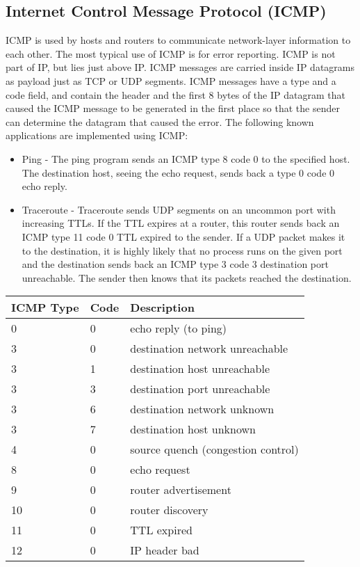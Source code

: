 \subsection{Internet Control Message Protocol (ICMP)}
ICMP is used by hosts and routers to communicate network-layer information to each other. The most typical use of ICMP is for error reporting. ICMP is not part of IP, but lies just above IP. ICMP messages are carried inside IP datagrams as payload just as TCP or UDP segments. ICMP messages have a type and a code field, and contain the header and the first 8 bytes of the IP datagram that caused the ICMP message to be generated in the first place so that the sender can determine the datagram that caused the error. The following known applications are implemented using ICMP:
\begin{itemize}
\item Ping - The ping program sends an ICMP type 8 code 0 to the specified host. The destination host, seeing the echo request, sends back a type 0 code 0 echo reply.
\item Traceroute - Traceroute sends UDP segments on an uncommon port with increasing TTLs. If the TTL expires at a router, this router sends back an ICMP type 11 code 0 TTL expired to the sender. If a UDP packet makes it to the destination, it is highly likely that no process runs on the given port and the destination sends back an ICMP type 3 code 3 destination port unreachable. The sender then knows that its packets reached the destination.
\end{itemize}
\renewcommand{\arraystretch}{1.4}
\begin{table}[H]
\centering
\begin{tabular}{lll}
\arrayrulecolor{NavyBlue}\hline
ICMP Type & Code & Description \\ \hline
\arrayrulecolor{black}
0 & 0 & echo reply (to ping) \\ \hline
3 & 0 & destination network unreachable \\ \hline
3 & 1 & destination host unreachable \\ \hline
3 & 3 & destination port unreachable \\ \hline
3 & 6 & destination network unknown \\ \hline
3 & 7 & destination host unknown \\ \hline
4 & 0 & source quench (congestion control) \\ \hline
8 & 0 & echo request \\ \hline
9 & 0 & router advertisement \\ \hline
10 & 0 & router discovery \\ \hline
11 & 0 & TTL expired \\ \hline
12 & 0 & IP header bad \\ \hline
\end{tabular}
\end{table}

